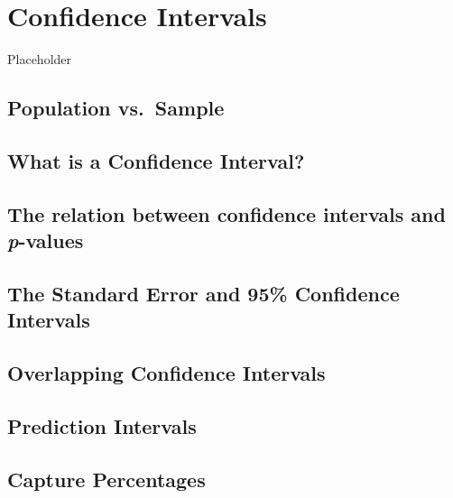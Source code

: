 \documentclass[
  oneside]{krantz}
\begin{document}
\hypertarget{confint}{%
\section{Confidence Intervals}\label{confint}}

Placeholder

\hypertarget{population-vs.-sample}{%
\subsection{Population vs.~Sample}\label{population-vs.-sample}}

\hypertarget{what-is-a-confidence-interval}{%
\subsection{What is a Confidence
Interval?}\label{what-is-a-confidence-interval}}

\hypertarget{relatCIp}{%
\subsection{\texorpdfstring{The relation between confidence intervals
and
\emph{p}-values}{The relation between confidence intervals and p-values}}\label{relatCIp}}

\hypertarget{the-standard-error-and-95-confidence-intervals}{%
\subsection{The Standard Error and 95\% Confidence
Intervals}\label{the-standard-error-and-95-confidence-intervals}}

\hypertarget{overlapping-confidence-intervals}{%
\subsection{Overlapping Confidence
Intervals}\label{overlapping-confidence-intervals}}

\hypertarget{prediction-intervals}{%
\subsection{Prediction Intervals}\label{prediction-intervals}}

\hypertarget{capture-percentages}{%
\subsection{Capture Percentages}\label{capture-percentages}}
\end{document}
